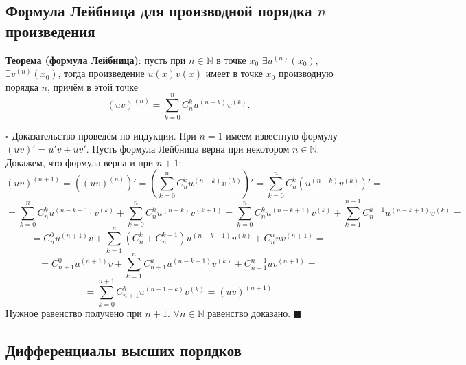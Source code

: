 \documentclass[12pt, a4paper, reqno]{article}
\begin{document}
\subsection{Формула Лейбница для производной порядка $n$ произведения}

    \textbf{Теорема (формула Лейбница)}: пусть при $n\in\mathbb{N}$ в точке $x_0$ $\exists
    u^{(n)}(x_0)$, $\exists v^{(n)}(x_0)$, тогда произведение $u(x)v(x)$ имеет в точке $x_0$
    производную порядка $n$, причём в этой точке
    \begin{equation*}
        (uv)^{(n)} = \sum\limits_{k = 0}^n C_{n}^{k}u^{(n - k)}v^{(k)}.
    \end{equation*}

    $\square$ Доказательство проведём по индукции. При $n = 1$ имеем известную формулу
    $(uv)' = u'v + uv'$. Пусть формула Лейбница верна при некотором $n\in\mathbb{N}$. Докажем, что
    формула верна и при $n + 1$:
    \begin{equation*}
        (uv)^{(n + 1)} = \left((uv)^{(n)}\right)' =
        \left(\sum\limits_{k = 0}^n C_{n}^{k}u^{(n - k)}v^{(k)}\right)' =
        \sum\limits_{k = 0}^n C_{n}^{k}\left(u^{(n - k)}v^{(k)}\right)' =
    \end{equation*}
    \begin{equation*}
        = \sum\limits_{k = 0}^n C_{n}^{k}u^{(n - k + 1)}v^{(k)} +
          \sum\limits_{k = 0}^n C_{n}^{k}u^{(n - k)}v^{(k + 1)} =
          \sum\limits_{k = 0}^n C_{n}^{k}u^{(n - k + 1)}v^{(k)} +
          \sum\limits_{k = 1}^{n + 1} C_{n}^{k - 1}u^{(n - k + 1)}v^{(k)} =
    \end{equation*}
    \begin{equation*}
        = C_{n}^{0}u^{(n + 1)}v +
          \sum\limits_{k = 1}^n (C_{n}^{k} + C_{n}^{k - 1})u^{(n - k + 1)}v^{(k)} +
          C_{n}^{n}uv^{(n + 1)} =
    \end{equation*}
    \begin{equation*}
        = C_{n + 1}^{0}u^{(n + 1)}v + \sum\limits_{k = 1}^n C_{n + 1}^{k}u^{(n - k + 1)}v^{(k)} +
          C_{n + 1}^{n + 1}uv^{(n + 1)} =
    \end{equation*}
    \begin{equation*}
        = \sum\limits_{k = 0}^{n + 1} C_{n + 1}^{k}u^{(n + 1 - k)}v^{(k)} = (uv)^{(n + 1)}
    \end{equation*}
    Нужное равенство получено при $n + 1$. $\forall n\in\mathbb{N}$ равенство доказано.
    $\blacksquare$

\subsection{Дифференциалы высших порядков}
\end{document}

